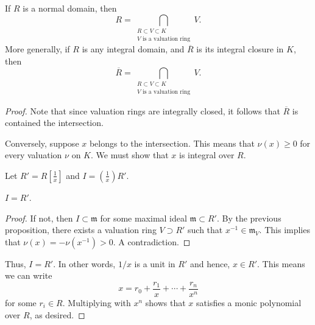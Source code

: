 \documentclass[12pt]{article}
\begin{document}
\begin{cor}
	If $R$ is a normal domain, then
	\begin{equation*} 
		R = \bigcap_{\substack{R \subset V \subset K \\ V \text{ is a valuation ring}}} V.
	\end{equation*}
	More generally, if $R$ is any integral domain, and $\overline{R}$ is its integral closure in $K$, then
	\begin{equation*} 
		\overline{R} = \bigcap_{\substack{R \subset V \subset K \\ V \text{ is a valuation ring}}} V.
	\end{equation*}
\end{cor}
\begin{proof} 
	Note that since valuation rings are integrally closed, it follows that $\overline{R}$ is contained the intersection. 

	Conversely, suppose $x$ belongs to the intersection. This means that $\nu(x) \ge 0$ for every valuation $\nu$ on $K$. We must show that $x$ is integral over $R$.

	Let $R' = R\left[\frac{1}{x}\right]$ and $I = \left(\frac{1}{x}\right) R'$. 

	\claim{} $I = R'$.
	\begin{proof} 
		If not, then $I \subset \mathfrak{m}$ for some maximal ideal $\mathfrak{m} \subset R'$. By the previous proposition, there exists a valuation ring $V \supset R'$ such that $x^{-1} \in \mathfrak{m}_{V}$. This implies that $\nu(x) = -\nu(x^{-1}) > 0$. A contradiction.
	\end{proof}

	Thus, $I = R'$. In other words, $1/x$ is a unit in $R'$ and hence, $x \in R'$. This means we can write
	\begin{equation*} 
		x = r_{0} + \frac{r_{1}}{x} + \cdots + \frac{r_{n}}{x^{n}}
	\end{equation*}
	for some $r_{i} \in R$. Multiplying with $x^{n}$ shows that $x$ satisfies a monic polynomial over $R$, as desired.
\end{proof}
\end{document}

